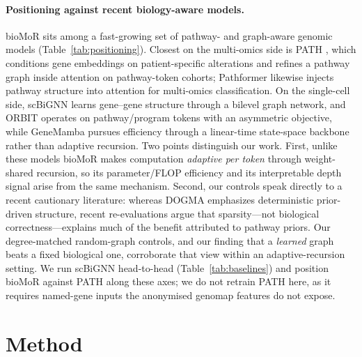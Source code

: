 \documentclass[letterpaper]{article}
\begin{document}
\paragraph{Positioning against recent biology-aware models.}
bioMoR sits among a fast-growing set of pathway- and graph-aware genomic models
(Table~\ref{tab:positioning}). Closest on the multi-omics side is PATH
\cite{howlader2026graph}, which conditions gene embeddings on patient-specific
alterations and refines a pathway graph inside attention on pathway-token cohorts;
Pathformer \cite{pathformer2023} likewise injects pathway structure into attention for
multi-omics classification. On the single-cell side, scBiGNN \cite{scbignn2023} learns
gene--gene structure through a bilevel graph network, and ORBIT \cite{orbit2026} operates
on pathway/program tokens with an asymmetric objective, while GeneMamba
\cite{genemamba2024} pursues efficiency through a linear-time state-space backbone rather
than adaptive recursion. Two points distinguish our work. First, unlike these models
bioMoR makes computation \emph{adaptive per token} through weight-shared recursion, so its
parameter/FLOP efficiency and its interpretable depth signal arise from the same
mechanism. Second, our controls speak directly to a recent cautionary literature: whereas
DOGMA \cite{dogma2024} emphasizes deterministic prior-driven structure, recent
re-evaluations \cite{pathwayprior2025} argue that sparsity---not biological
correctness---explains much of the benefit attributed to pathway priors. Our
degree-matched random-graph controls, and our finding that a \emph{learned} graph beats a
fixed biological one, corroborate that view within an adaptive-recursion setting. We run scBiGNN
head-to-head (Table~\ref{tab:baselines}) and position bioMoR against PATH along these axes; we do
not retrain PATH here, as it requires named-gene inputs the anonymised genomap features do not expose.

\section{Method}
\end{document}

